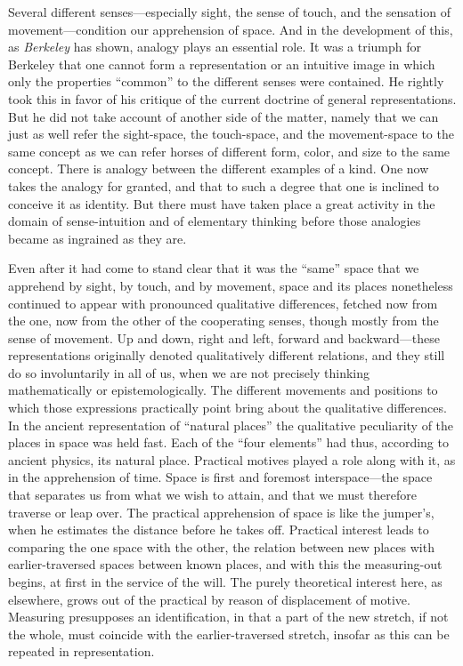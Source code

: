 \documentclass[12pt,a4paper]{book}
\newcommand{\opage}[1]{\marginnote{\footnotesize\textit{[#1]}}}
\begin{document}
Several different senses---especially sight, the sense of touch, and the
sensation of movement---condition our apprehension of space. And in the
development of this, as \emph{Berkeley} has shown, analogy plays an essential
role. It was a triumph for Berkeley that one cannot form a representation or
an intuitive image in which only the properties ``common'' to the different
senses were contained. He rightly took this in favor of his critique of the
current doctrine of general representations. But he did not take account of
another side of the matter, namely that we can just as well refer the
sight-space, the touch-space, and the movement-space to the same concept as
we can refer horses of different form, color, and size to the same concept.
There is analogy between the different examples of a kind. One now takes the
analogy for granted, and that to such a degree that one is inclined to
conceive it as identity. But there must have taken place a great activity in
the domain of sense-intuition and of elementary thinking before those
analogies became as ingrained as they are.

Even after it had come to stand clear that it was the ``same'' space that we
apprehend by sight, by touch, and by movement, space and its places
nonetheless continued to appear with pronounced qualitative differences,
fetched now from \opage{198}the one, now from the other of the cooperating senses,
though mostly from the sense of movement. Up and down, right and left,
forward and backward---these representations originally denoted qualitatively
different relations, and they still do so involuntarily in all of us, when we
are not precisely thinking mathematically or epistemologically. The different
movements and positions to which those expressions practically point bring
about the qualitative differences. In the ancient representation of ``natural
places'' the qualitative peculiarity of the places in space was held fast.
Each of the ``four elements'' had thus, according to ancient physics, its
natural place. Practical motives played a role along with it, as in the
apprehension of time. Space is first and foremost interspace---the space that
separates us from what we wish to attain, and that we must therefore traverse
or leap over. The practical apprehension of space is like the jumper's, when
he estimates the distance before he takes off. Practical interest leads to
comparing the one space with the other, the relation between new places with
earlier-traversed spaces between known places, and with this the
measuring-out begins, at first in the service of the will. The purely
theoretical interest here, as elsewhere, grows out of the practical by reason
of displacement of motive. Measuring presupposes an identification, in that a
part of the new stretch, if not the whole, must coincide with the
earlier-traversed stretch, insofar as this can be repeated in representation.
\end{document}
